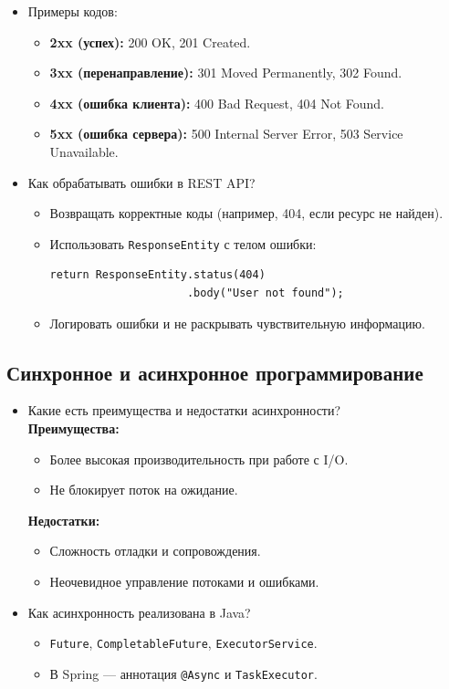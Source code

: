\documentclass[a4paper,14pt]{article}
\begin{document}
\begin{itemize}
\item Примеры кодов:
\begin{itemize}
  \item \textbf{2xx (успех):} 200 OK, 201 Created.
  \item \textbf{3xx (перенаправление):} 301 Moved Permanently, 302 Found.
  \item \textbf{4xx (ошибка клиента):} 400 Bad Request, 404 Not Found.
  \item \textbf{5xx (ошибка сервера):} 500 Internal Server Error, 503 Service Unavailable.
\end{itemize}

\item Как обрабатывать ошибки в REST API?
\begin{itemize}
  \item Возвращать корректные коды (например, 404, если ресурс не найден).
  \item Использовать \texttt{ResponseEntity} с телом ошибки:
\begin{lstlisting}[style=javastyle]
return ResponseEntity.status(404)
                     .body("User not found");
\end{lstlisting}
  \item Логировать ошибки и не раскрывать чувствительную информацию.
\end{itemize}
\end{itemize}
\subsection{Синхронное и асинхронное программирование}

\begin{itemize}
\item Какие есть преимущества и недостатки асинхронности? \\
\textbf{Преимущества:}
\begin{itemize}
  \item Более высокая производительность при работе с I/O.
  \item Не блокирует поток на ожидание.
\end{itemize}
\textbf{Недостатки:}
\begin{itemize}
  \item Сложность отладки и сопровождения.
  \item Неочевидное управление потоками и ошибками.
\end{itemize}

\item Как асинхронность реализована в Java? \\
\begin{itemize}
  \item \texttt{Future}, \texttt{CompletableFuture}, \texttt{ExecutorService}.
  \item В Spring — аннотация \texttt{@Async} и \texttt{TaskExecutor}.
\end{itemize}
\end{itemize}
\end{document}
